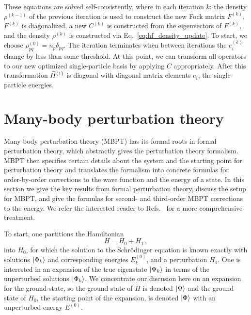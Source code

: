 These equations are solved self-consistently,
where in each iteration $k$:
the density $\rho^{(k-1)}$ of the previous iteration
is used to construct the new Fock matrix $F^{(k)}$,
$F^{(k)}$ is diagonalized,
a new $C^{(k)}$ is constructed from the eigenvectors of $F^{(k)}$,
and the density $\rho^{(k)}$ is constructed via Eq.~\eqref{eq:hf_density_update}.
To start, we choose $\rho^{(0)}_{pq} = n_p \delta_{pq}$.
The iteration terminates when between iterations
the $e_{i}^{(k)}$ change by less than some threshold.
At this point, we can transform all operators to our new optimized single-particle basis
by applying $C$ appropriately.
After this transformation ${\bar{H}}^{(1)}$ is diagonal with diagonal matrix elements $e_i$,
the single-particle energies.

\section{Many-body perturbation theory}\label{sec:mbpt}

Many-body perturbation theory (MBPT) has its formal roots in formal perturbation theory,
which abstractly gives the perturbation theory formalism.
MBPT then specifies certain details about the system
and the starting point for perturbation theory
and translates the formalism into concrete formulas
for order-by-order corrections to the wave function and the energy of a state.
In this section we give the key results from formal perturbation theory,
discuss the setup for MBPT,
and give the formulas for second- and third-order MBPT corrections to the energy.
We refer the interested reader to Refs.~\cite{Shav09mbpt_cc_book,Tich20mbptreview}
for a more comprehensive treatment.

To start, one partitions the Hamiltonian
\begin{equation}
  H = H_0 + H_1\,,
\end{equation}
into $H_0$,
for which the solution to the Schr\"{o}dinger equation is known exactly
with solutions $\ket{\Phi_k}$ and corresponding energies $E^{(0)}_{k}$,
and a perturbation $H_1$.
One is interested in an expansion of the true eigenstate $\ket{\Psi_k}$
in terms of the unperturbed solutions $\ket{\Phi_k}$.
We concentrate our discusion here on an expansion for the ground state,
so the ground state of $H$ is denoted $\ket{\Psi}$
and the ground state of $H_0$,
the starting point of the expansion,
is denoted $\ket{\Phi}$ with an unperturbed energy $E^{(0)}$.

